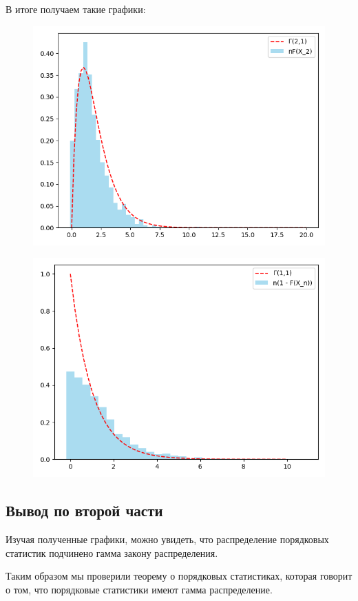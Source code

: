 \documentclass{article}
\begin{document}
В итоге получаем такие графики:

\begin{figure}[H]
      \centering
      \includegraphics[width=0.5\linewidth]{Python/second-two-one}\label{fig:figure2}
\end{figure}

\begin{figure}[H]
      \centering
      \includegraphics[width=0.5\linewidth]{Python/second-one-one}\label{fig:figure3}
\end{figure}

\subsection{Вывод по второй части}
Изучая полученные графики, можно увидеть, что распределение порядковых статистик подчинено гамма закону распределения.

Таким образом мы проверили теорему о порядковых статистиках,
которая говорит о том, что порядковые статистики имеют гамма распределение.
\end{document}
